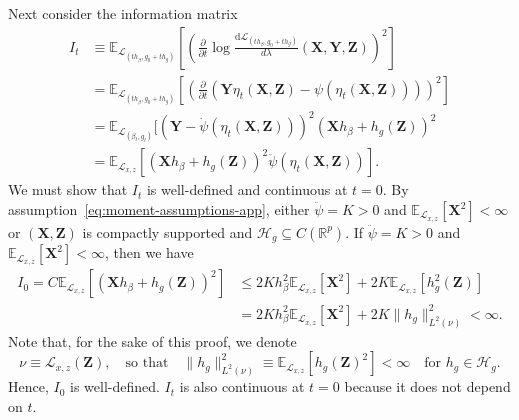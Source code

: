 \documentclass[12pt]{article}
\theoremstyle{definition}
\theoremstyle{remark}
\newcommand{\E}{\mathbb E}								%
\newcommand{\R}{\mathbb{R}}								%
\newcommand{\prx}{\bm X}								%
\newcommand{\prz}{\bm Z}								%
\newcommand{\pry}{{\bm Y}}								%
\newcommand{\law}{\mathcal L}							%
\renewcommand{\H}{\mathcal H}		 					%
\begin{document}
Next consider the information matrix
\begin{align*}
	I_t &\equiv \E_{\law_{(th_\beta, g_0 + th_g)}}\left[\left(\frac{\partial}{\partial t}\log \frac{\mathrm d \law_{(th_\beta, g_0 + th_g)}}{d\lambda}(\prx, \pry, \prz)\right)^2\right] \\
	&= \E_{\law_{(th_\beta, g_0 + th_g)}}\left[\left(\frac{\partial}{\partial t}(\pry \eta_t(\prx, \prz) - \psi(\eta_t(\prx, \prz)))\right)^2\right] \\
	&= \E_{\law_{(\beta_t,g_t)}}[(\pry-\dot{\psi}(\eta_t(\prx, \prz)))^2(\prx h_\beta+h_g(\prz))^2 \\
	&=\E_{\law_{x,z}}\left[(\prx h_\beta+h_g(\prz))^2\ddot{\psi}(\eta_t(\prx, \prz))\right].
\end{align*}
We must show that $I_t$ is well-defined and continuous at $t = 0$. By assumption~\eqref{eq:moment-assumptions-app}, either $\ddot \psi = K > 0$ and $\E_{\law_{x,z}}[\prx^2] < \infty$ or $(\prx,\prz)$ is compactly supported and $\H_g \subseteq C(\R^p)$. If $\ddot \psi = K > 0$ and $\E_{\law_{x,z}}[\prx^2] < \infty$, then we have 
\begin{align*}
I_0=C\E_{\law_{x,z}}\left[(\prx h_\beta+h_g(\prz))^2\right]&\leq 2Kh_\beta^2\E_{\law_{x,z}}[\prx^2]+2K\E_{\law_{x,z}}[h_g^2(\prz)] \\
&= 2Kh_\beta^2\E_{\law_{x,z}}[\prx^2]+2K\|h_g\|_{L^2(\nu)}^2 <\infty.
\end{align*}
Note that, for the sake of this proof, we denote
\begin{equation}
\nu \equiv \law_{x,z}(\prz), \quad \text{so that} \quad \|h_g\|_{L^2(\nu)}^2 \equiv \E_{\law_{x,z}}[h_g(\prz)^2] < \infty \quad \text{for } h_g \in \H_g. 
\end{equation}
Hence, $I_0$ is well-defined. $I_t$ is also continuous at $t = 0$ because it does not depend on $t$. 
\end{document}
